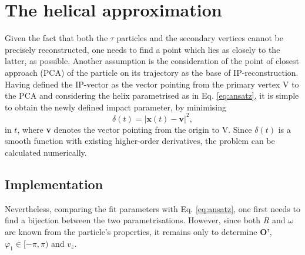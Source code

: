 \section{The helical approximation}
Given the fact that both the $\tau$ particles and the secondary vertices cannot be precisely reconstructed, one needs to find a point which lies as closely to the latter, as possible. Another assumption is the consideration of the point of closest approach (PCA) of the particle on its trajectory as the base of IP-reconstruction. Having defined the IP-vector as the vector pointing from the primary vertex V to the PCA and considering the helix parametrised as in Eq. \ref{eq:ansatz}, it is simple to obtain the newly defined impact parameter, by minimising
\begin{equation}
	\delta(t) = |\boldsymbol{x}(t)-\boldsymbol{v}|^2,
\end{equation}
in $t$, where \textbf{v} denotes the vector pointing from the origin to V. Since $\delta(t)$ is a smooth function with existing higher-order derivatives, the problem can be  calculated numerically.
\subsection{Implementation}
Nevertheless, comparing the fit parameters with Eq. \ref{eq:ansatz}, one first needs to find a bijection between the two parametrisations. However, since both $R$ and $\omega$ are known from the particle's properties, it remains only to determine \textbf{O'}, $\varphi_1 \in [-\pi,\pi)$ and $v_z$.
